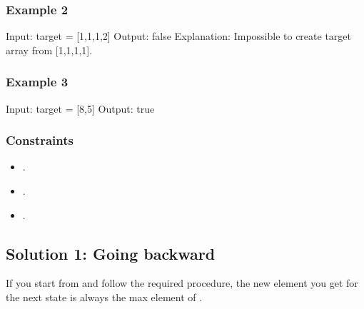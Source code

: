 \documentclass[letterpaper,12pt,english]{book}
\begin{document}
\subsubsection{Example 2}
\label{\detokenize{Priority_Queue/1354_Construct_Target_Array_With_Multiple_Sums:example-2}}
\begin{sphinxVerbatim}[commandchars=\\\{\}]
Input: target = [1,1,1,2]
Output: false
Explanation: Impossible to create target array from [1,1,1,1].
\end{sphinxVerbatim}


\subsubsection{Example 3}
\label{\detokenize{Priority_Queue/1354_Construct_Target_Array_With_Multiple_Sums:example-3}}
\begin{sphinxVerbatim}[commandchars=\\\{\}]
Input: target = [8,5]
Output: true
\end{sphinxVerbatim}


\subsubsection{Constraints}
\label{\detokenize{Priority_Queue/1354_Construct_Target_Array_With_Multiple_Sums:constraints}}\begin{itemize}
\item {} 
\sphinxAtStartPar
{}.

\item {} 
\sphinxAtStartPar
{}.

\item {} 
\sphinxAtStartPar
{}.

\end{itemize}


\subsection{Solution 1: Going backward}
\label{\detokenize{Priority_Queue/1354_Construct_Target_Array_With_Multiple_Sums:solution-1-going-backward}}
\sphinxAtStartPar
If you start from  and follow the required procedure, the new element  you get for the next state is always the max element of .
\end{document}
